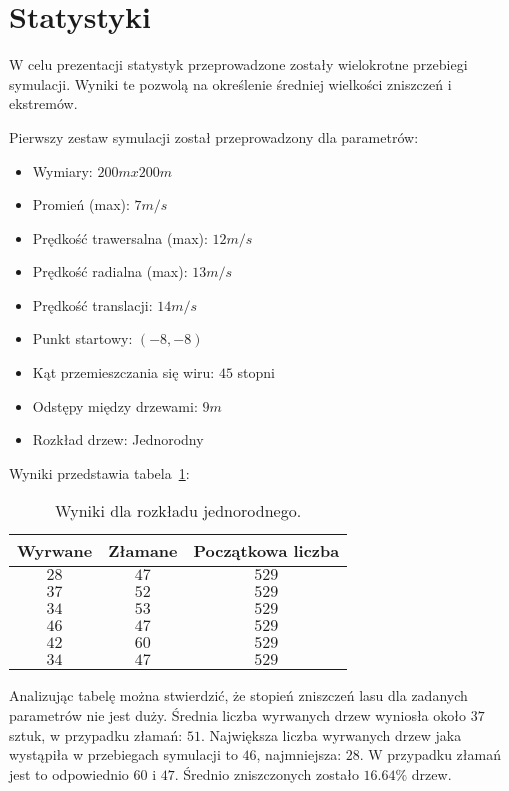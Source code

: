 \section{Statystyki}

W celu prezentacji statystyk przeprowadzone zostały wielokrotne przebiegi symulacji.
Wyniki te pozwolą na określenie średniej wielkości zniszczeń i ekstremów.

Pierwszy zestaw symulacji został przeprowadzony dla parametrów:
\begin{itemize}
\item Wymiary: $200m x 200m$
\item Promień (max): $7m/s$
\item Prędkość trawersalna (max): $12m/s$
\item Prędkość radialna (max): $13m/s$
\item Prędkość translacji: $14m/s$
\item Punkt startowy: $(-8, -8)$
\item Kąt przemieszczania się wiru: $45$ stopni
\item Odstępy między drzewami: $9m$
\item Rozkład drzew: Jednorodny
\end{itemize}

Wyniki przedstawia tabela~\ref{tab:sym1}:

 \begin{table}[h!]
 \caption{Wyniki dla rozkładu jednorodnego.}
 \label{tab:sym1}
 \begin{center}
\begin{tabular} {|c|c|c|}
\hline
Wyrwane & Złamane & Początkowa liczba \\ \hline \hline
$28$ 	& $47$	&	$529$ \\ \hline
$37$ 	& $52$ 	&	$529$ \\ \hline
$34$ 	& $53$ 	&	$529$ \\ \hline
$46$ 	& $47$	&	$529$ \\ \hline
$42$ 	& $60$	&	$529$ \\ \hline
$34$ 	& $47$ 	&	$529$ \\ \hline
\end{tabular}
\end{center}
\end{table}


Analizując tabelę można stwierdzić, że stopień zniszczeń lasu dla zadanych parametrów nie jest duży. Średnia liczba wyrwanych drzew wyniosła około $37$ sztuk, w przypadku złamań: $51$. Największa liczba wyrwanych drzew jaka wystąpiła w przebiegach symulacji to $46$, najmniejsza: $28$. W przypadku złamań jest to odpowiednio $60$ i $47$.
Średnio zniszczonych zostało $16.64\%$ drzew.

